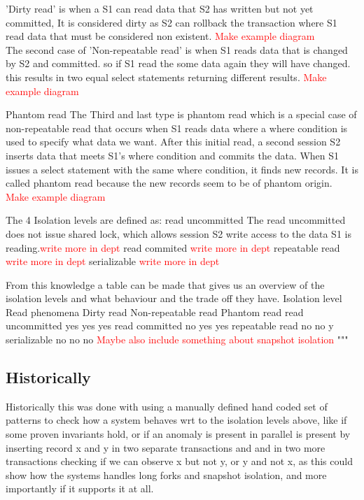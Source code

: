 \documentclass[
  a4paper,  %
  twoside,  %
  bibliography=totoc,
  headsepline,
  cleardoublepage=empty,
  parskip=half,
  draft=false
]{scrbook}
\begin{document}
'Dirty read' is when a S1 can read data that S2 has written but not yet committed, It is considered dirty as S2 can rollback the transaction where S1 read data that must be considered non existent. \textcolor{red}{Make example diagram} 
\\
The second case of 'Non-repeatable read' is when S1 reads data that is changed by S2 and committed. so if S1 read the some data again they will have changed. this results in two equal select statements returning different results.  \textcolor{red}{Make example diagram} 

Phantom read
The Third and last type is phantom read which is a special case of non-repeatable read that occurs when S1 reads data where a where condition is used to specify what data we want. After this initial read, a second session S2 inserts data that meets S1's where condition and commits the data. When S1 issues a select statement with the same where condition, it finds new records. It is called phantom read because the new records seem to be of phantom origin.
 \textcolor{red}{Make example diagram} 

The 4 Isolation levels are defined as:
read uncommitted
       The read uncommitted does not issue shared lock, which allows session S2 write access to the data S1 is reading.\textcolor{red}{write more in dept} 
 read commited
 \textcolor{red}{write more in dept} 
repeatable read
\textcolor{red}{write more in dept} 
serializable
\textcolor{red}{write more in dept} 



From this knowledge a table can be made that gives us an overview of the isolation levels and what behaviour and the trade off they have.
Isolation level	Read phenomena
Dirty read	Non-repeatable read	Phantom read
read uncommitted	yes	yes	yes
read committed	no	yes	yes
repeatable read	no	no	y
serializable	no	no	no
\textcolor{red}{Maybe also include something about snapshot isolation} 
"""

\subsection{Historically}

Historically this was done with using a manually defined hand coded set of patterns to check how a system behaves wrt to the isolation levels above, like if some proven invariants hold, or if an anomaly is present in parallel is present by inserting record x and y in two separate transactions and and in two more transactions checking if we can observe x but not y, or y and not x, as this could show how the systems handles long forks and snapshot isolation, and more importantly if it supports it at all.
\end{document}
